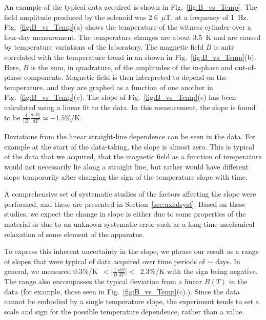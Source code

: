 An example of the typical data acquired is shown in
Fig.~\ref{fig:B_vs_Temp}.  The field amplitude produced by the
solenoid was 2.6~$\mu$T, at a frequency of 1~Hz.
Fig.~\ref{fig:B_vs_Temp}(a) shows the temperature of the witness
cylinder over a four-day measurement.  The temperature changes are
about 3.5~K and are caused by temperature variations of the
laboratory.
%
%
The magnetic field $B$ is anti-correlated with the temperature trend
in an shown in Fig.~\ref{fig:B_vs_Temp}(b).  Here, $B$ is the sum, in
quadrature, of the amplitudes of the in-phase and out-of-phase
components.  Magnetic field is then interpreted to depend on the
temperature, and they are graphed as a function of one another in
Fig.~\ref{fig:B_vs_Temp}(c).  The slope of Fig.~\ref{fig:B_vs_Temp}(c)
has been calculated using a linear fit to the data.  In this
measurement, the slope is found to be
$\frac{1}{|B|}\frac{d|B|}{dT}\simeq -1.5\%$/K.

Deviations from the linear straight-line dependence can be seen in the
data.  For example at the start of the data-taking, the slope is
almost zero.  This is typical of the data that we acquired, that the
magnetic field as a function of temperature would not necessarily lie
along a straight line, but rather would have different slope
temporarily after changing the sign of the temperature slope with
time.

A comprehensive set of systematic studies of the factors affecting the
slope were performed, and these are presented in
Section~\ref{sec:axialsyst}.  Based on these studies, we expect the
change in slope is either due to some properties of the material or
due to an unknown systematic error such as a long-time mechanical
relaxation of some element of the apparatus.

To express this inherent uncertainty in the slope, we phrase our
result as a range of slopes that were typical of data acquired over
time periods of $\sim$ days.  In general, we measured
0.3\%/K~$<\vert\frac{1}{B}\frac{dB}{dT}\vert<$~2.3\%/K with the sign
being negative.  The range also encompasses the typical deviation from
a linear $B(T)$ in the data (for example, those seen in
Fig.~\ref{fig:B_vs_Temp}(c).).  Since the data cannot be embodied by a
single temperature slope, the experiment tends to set a scale and sign
for the possible temperature dependence, rather than a value.

